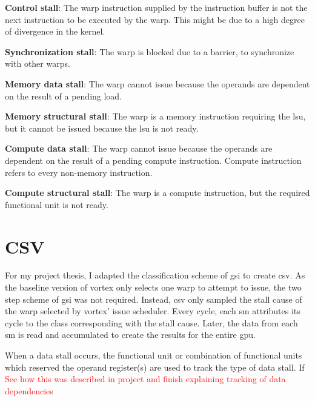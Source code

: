 \noindent
\textbf{Control stall}: The warp instruction supplied by the instruction buffer is not the next instruction to be executed by the warp. This might be due to a high degree of divergence in the kernel.

\noindent
\textbf{Synchronization stall}: The warp is blocked due to a barrier, to synchronize with other warps.

\noindent
\textbf{Memory data stall}: The warp cannot issue because the operands are dependent on the result of a pending load.

\noindent
\textbf{Memory structural stall}: The warp is a memory instruction requiring the \acrshort{lsu}, but it cannot be issued because the \acrshort{lsu} is not ready.

\noindent
\textbf{Compute data stall}: The warp cannot issue because the operands are dependent on the result of a pending compute instruction. Compute instruction refers to every non-memory instruction. 

\noindent
\textbf{Compute structural stall}: The warp is a compute instruction, but the required functional unit is not ready.


\section{CSV} \label{sec:csv}

For my project thesis\cite{Aurud_Project}, I adapted the classification scheme of \acrshort{gsi} to create \acrshort{csv}. As the baseline version of \Gls{vortex} only selects one warp to attempt to issue, the two step scheme of \acrshort{gsi} was not required. Instead, \acrshort{csv} only sampled the stall cause of the warp selected by \Gls{vortex}' issue scheduler. Every cycle, each \acrshort{sm} attributes its cycle to the class corresponding with the stall cause. Later, the data from each \acrshort{sm} is read and accumulated to create the results for the entire \acrshort{gpu}.

When a data stall occurs, the functional unit or combination of functional units which reserved the operand register(s) are used to track the type of data stall. If \textcolor{red}{See how this was described in project and finish explaining tracking of data dependencies} 


